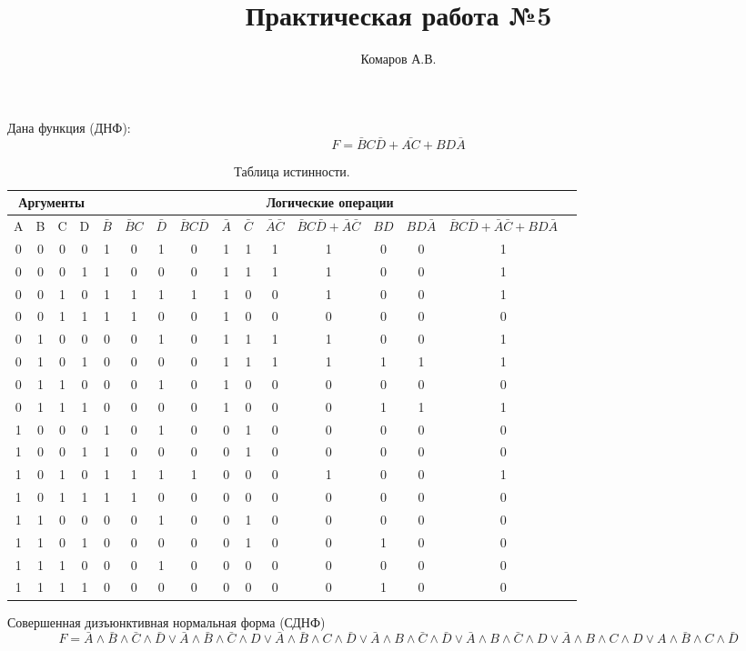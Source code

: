 \documentclass[a4paper,12pt]{article}
\author{Комаров А.В.}
\title{Практическая работа №5}
\begin{document}
\maketitle
Дана функция (ДНФ):
$$F=\bar{B}C\bar{D}+\bar{AC}+BD\bar{A}$$

\begin{table}[h]
\renewcommand{\tabcolsep}{0.15cm}
\caption{\label{TRT1} Таблица истинности.}

\begin{tabular}{|c|c|c|c|c|c|c|c|c|c|c|c|c|c|c|c|}
\hline
\multicolumn{4}{|c|}{Аргументы} & \multicolumn{11}{|c|}{Логические операции} \\
\hline
\rule{0cm}{0.5cm}
A & B & C & D & 
\small $\bar{B}$ & 
\small $\bar{B}C$ & 
\small $\bar{D}$&
\small $\bar{B}C\bar{D}$ & 
\small $\bar{A}$ &
\small $\bar{C}$ & 
\small $\bar{A}\bar{C}$ & 
\small $\bar{B}C\bar{D}+\bar{A}\bar{C}$ &
\small $BD$ &
\small $BD\bar{A}$ &
\small $\bar{B}C\bar{D}+\bar{A}\bar{C}+BD\bar{A}$\\
\hline
  0 & 0 & 0 & 0 & 1 & 0 & 1 & 0 & 1 & 1 & 1 & 1 & 0 & 0 & 1 \\
  0 & 0 & 0 & 1 & 1 & 0 & 0 & 0 & 1 & 1 & 1 & 1 & 0 & 0 & 1 \\
  0 & 0 & 1 & 0 & 1 & 1 & 1 & 1 & 1 & 0 & 0 & 1 & 0 & 0 & 1 \\
  0 & 0 & 1 & 1 & 1 & 1 & 0 & 0 & 1 & 0 & 0 & 0 & 0 & 0 & 0 \\
  0 & 1 & 0 & 0 & 0 & 0 & 1 & 0 & 1 & 1 & 1 & 1 & 0 & 0 & 1 \\
  0 & 1 & 0 & 1 & 0 & 0 & 0 & 0 & 1 & 1 & 1 & 1 & 1 & 1 & 1 \\
  0 & 1 & 1 & 0 & 0 & 0 & 1 & 0 & 1 & 0 & 0 & 0 & 0 & 0 & 0 \\
  0 & 1 & 1 & 1 & 0 & 0 & 0 & 0 & 1 & 0 & 0 & 0 & 1 & 1 & 1 \\
  1 & 0 & 0 & 0 & 1 & 0 & 1 & 0 & 0 & 1 & 0 & 0 & 0 & 0 & 0 \\
  1 & 0 & 0 & 1 & 1 & 0 & 0 & 0 & 0 & 1 & 0 & 0 & 0 & 0 & 0 \\
  1 & 0 & 1 & 0 & 1 & 1 & 1 & 1 & 0 & 0 & 0 & 1 & 0 & 0 & 1 \\
  1 & 0 & 1 & 1 & 1 & 1 & 0 & 0 & 0 & 0 & 0 & 0 & 0 & 0 & 0 \\
  1 & 1 & 0 & 0 & 0 & 0 & 1 & 0 & 0 & 1 & 0 & 0 & 0 & 0 & 0 \\
  1 & 1 & 0 & 1 & 0 & 0 & 0 & 0 & 0 & 1 & 0 & 0 & 1 & 0 & 0 \\
  1 & 1 & 1 & 0 & 0 & 0 & 1 & 0 & 0 & 0 & 0 & 0 & 0 & 0 & 0 \\
  1 & 1 & 1 & 1 & 0 & 0 & 0 & 0 & 0 & 0 & 0 & 0 & 1 & 0 & 0 \\
  \hline
\end{tabular}
\end{table} 
Совершенная дизъюнктивная нормальная форма (СДНФ)
$$ F=\bar{A} \land \bar{B} \land \bar{C} \land \bar{D}\lor
\bar{A} \land \bar{B} \land \bar{C} \land D \lor
\bar{A} \land \bar{B} \land C \land \bar{D}\lor
\bar{A} \land B \land \bar{C} \land \bar{D}\lor
\bar{A} \land B \land \bar{C} \land D\lor
\bar{A} \land B \land C \land D\lor
A \land \bar{B} \land C \land \bar{D}$$\\
\end{document}
